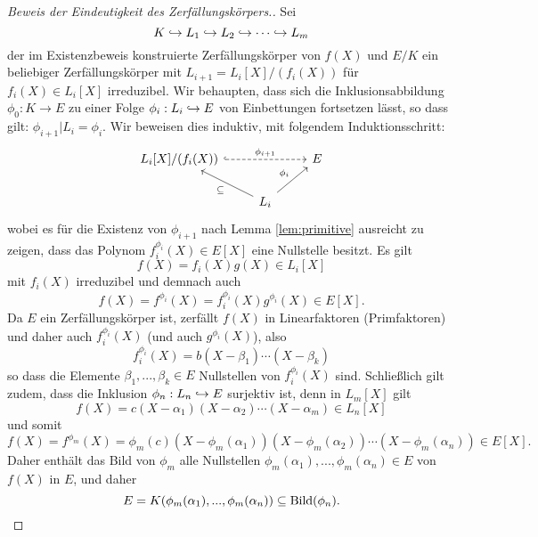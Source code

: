 \documentclass{book}
\begin{document}
\begin{proof}[Beweis der Eindeutigkeit des Zerfällungskörpers.]
    Sei 
    \[
        K \hookrightarrow L_1 \hookrightarrow L_2 \hookrightarrow \cdots \hookrightarrow L_m
    \]
    der im Existenzbeweis konstruierte Zerfällungskörper von $f(X)$ und $E/K$
    ein beliebiger Zerfällungskörper mit $L_{i+1} = L_i[X]/(f_i(X))$ für
    $f_i(X) \in L_i[X]$ irreduzibel. Wir behaupten, dass sich die
    Inklusionsabbildung $\phi_0: K \to E$ zu einer Folge $\phi_i: L_i \hra E$
    von Einbettungen fortsetzen lässt, so dass gilt: $\phi_{i+1}|L_i = \phi_i$.
    Wir beweisen dies induktiv, mit folgendem Induktionsschritt: 
    \[
        \begin{tikzcd}
            L_i[X]/(f_i(X)) \ar[hook, dashed]{rr}{\phi_{i+1}} & &E\\
            & L_i\ar{ul}{\subset} \ar{ur}{\phi_i} & 
        \end{tikzcd}
    \]
    wobei es für die Existenz von $\phi_{i+1}$ nach Lemma \ref{lem:primitive}
    ausreicht zu zeigen, dass das Polynom $f_i^{\phi_i}(X) \in E[X]$ eine
    Nullstelle besitzt. Es gilt
    \[
        f(X) = f_i(X) g(X) \in L_i[X]
    \]
    mit $f_i(X)$ irreduzibel und demnach auch 
    \[
        f(X) = f^{\phi_i}(X) = f_i^{\phi_i}(X) g^{\phi_i}(X) \in E[X].
    \]
    Da $E$ ein Zerfällungskörper ist, zerfällt $f(X)$ in Linearfaktoren
    (Primfaktoren) und daher auch $f_i^{\phi_i}(X)$ (und auch $g^{\phi_i}(X)$), also
    \[
        f_i^{\phi_i}(X) = b (X-\beta_1) \cdots (X - \beta_k)
    \]
    so dass die Elemente $\beta_1, ..., \beta_k \in E$ Nullstellen von
    $f_i^{\phi_i}(X)$ sind.  Schließlich gilt zudem, dass die Inklusion
    $\phi_n: L_n \hra E$ surjektiv ist, denn in $L_m[X]$ gilt
    \[
        f(X) = c (X - \alpha_1) (X-\alpha_2) \cdots (X-\alpha_m)  \in L_n[X]
    \]
    und somit 
    \[
        f(X) = f^{\phi_m}(X) = \phi_m(c) (X - \phi_m(\alpha_1)) (X- \phi_m(\alpha_2)) \cdots (X- \phi_m(\alpha_n)) \in E[X].
    \]
    Daher enthält das Bild von $\phi_m$ alle Nullstellen $\phi_m(\alpha_1), ..., \phi_m(\alpha_n) \in E$ von $f(X)$ in $E$, und daher 
    \[
        E = K(\phi_m(\alpha_1), ..., \phi_m(\alpha_n)) \subset \Bild(\phi_n). 
    \]
\end{proof}
\end{document}
